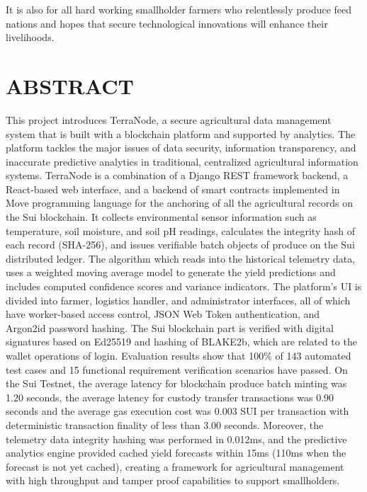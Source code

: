 \documentclass[12pt,a4paper]{report}
\begin{document}
It is also for all hard working smallholder farmers who relentlessly produce feed nations and hopes that secure technological innovations will enhance their livelihoods.

\newpage
\chapter*{ABSTRACT}
\doublespacing

This project introduces TerraNode, a secure agricultural data management system that is built with a blockchain platform and supported by analytics. The platform tackles the major issues of data security, information transparency, and inaccurate predictive analytics in traditional, centralized agricultural information systems. TerraNode is a combination of a Django REST framework backend, a React-based web interface, and a backend of smart contracts implemented in Move programming language for the anchoring of all the agricultural records on the Sui blockchain. It collects environmental sensor information such as temperature, soil moisture, and soil pH readings, calculates the integrity hash of each record (SHA-256), and issues verifiable batch objects of produce on the Sui distributed ledger. The algorithm which reads into the historical telemetry data, uses a weighted moving average model to generate the yield predictions and includes computed confidence scores and variance indicators. The platform's UI is divided into farmer, logistics handler, and administrator interfaces, all of which have worker-based access control, JSON Web Token authentication, and Argon2id password hashing. The Sui blockchain part is verified with digital signatures based on Ed25519 and hashing of BLAKE2b, which are related to the wallet operations of login. Evaluation results show that 100\% of 143 automated test cases and 15 functional requirement verification scenarios have passed. On the Sui Testnet, the average latency for blockchain produce batch minting was 1.20 seconds, the average latency for custody transfer transactions was 0.90 seconds and the average gas execution cost was 0.003 SUI per transaction with deterministic transaction finality of less than 3.00 seconds. Moreover, the telemetry data integrity hashing was performed in 0.012ms, and the predictive analytics engine provided cached yield forecasts within 15ms (110ms when the forecast is not yet cached), creating a framework for agricultural management with high throughput and tamper proof capabilities to support smallholders.
\end{document}
